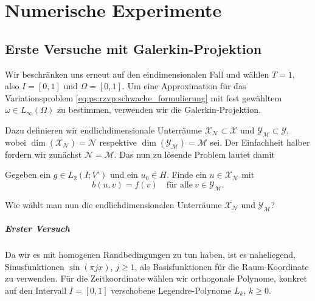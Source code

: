 
\chapter{Numerische Experimente} %
\label{cha:numerische_experimente}


\section{Erste Versuche mit Galerkin-Projektion} %
\label{sec:erste_versuche_mit_galerkin_projektion}

Wir beschränken uns erneut auf den eindimensionalen Fall und wählen $T = 1$, also $I = [0, 1]$ und $\Omega = [0 ,1]$.
Um eine Approximation für das Variationsproblem \cref{eq:ps:rzvp:schwache_formulierung} mit fest gewähltem $\omega \in L_{\infty}(\Omega)$ zu bestimmen, verwenden wir die Galerkin-Projektion.

Dazu definieren wir endlichdimensionale Unterräume $\mathcal X_{\mathcal N} \subset \mathcal X$ und $\mathcal Y_{\mathcal M} \subset \mathcal Y$, wobei $\dim(\mathcal X_{\mathcal N}) = \mathcal N$ respektive $\dim(\mathcal Y_{\mathcal M}) = \mathcal M$ sei.
Der Einfachheit halber fordern wir zunächst $\mathcal N = \mathcal M$.
Das nun zu lösende Problem lautet damit

\begin{Problem}
    Gegeben ein $g \in L_{2}(I; V')$ und ein $u_{0} \in H$. Finde ein $u \in \mathcal X_{\mathcal N}$ mit
    \begin{equation}
        \label{eq:ps:rzvp:schwache_formulierung_3}
        b(u, v) = f(v) \quad \text{für alle}~v \in \mathcal Y_{\mathcal M}.
    \end{equation}
\end{Problem}

Wie wählt man nun die endlichdimensionalen Unterräume $\mathcal X_{\mathcal N}$ und $\mathcal Y_{\mathcal M}$?

\paragraph{Erster Versuch} %
\label{par:erster_versuch}

Da wir es mit homogenen Randbedingungen zu tun haben, ist es naheliegend, Sinusfunktionen $\sin(\pi j x)$, $j \geq 1$, als Basisfunktionen für die Raum-Koordinate zu verwenden.
Für die Zeitkoordinate wählen wir orthogonale Polynome, konkret auf den Intervall $I = [0, 1]$ verschobene Legendre-Polynome $L_{k}$, $k \geq 0$.

